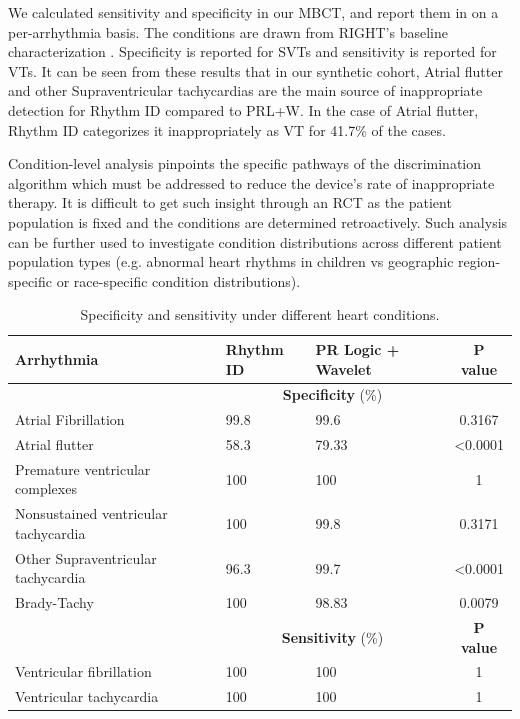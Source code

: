 We calculated sensitivity and specificity in our MBCT, and report them in  on a per-arrhythmia basis.
The conditions are drawn from RIGHT's baseline characterization \cite{GoldABBTB11_RIGHTresults}.
Specificity is reported for SVTs and sensitivity is reported for VTs.
It can be seen from these results that in our synthetic cohort, Atrial flutter and other Supraventricular tachycardias are the main source of inappropriate detection for Rhythm ID compared to PRL+W.
In the case of Atrial flutter, Rhythm ID categorizes it inappropriately as VT for 41.7\% of the cases.

Condition-level analysis pinpoints the specific pathways of the discrimination algorithm which must be addressed to reduce the device's rate of inappropriate therapy. It is difficult to get such insight through an RCT as the patient population is fixed and the conditions are determined retroactively. Such analysis can be further used to investigate condition distributions across different patient population types (e.g. abnormal heart rhythms in children vs geographic region-specific or race-specific condition distributions).   

\begin{table}[t]
\begin{tabular}{|p{2.8cm}|p{1.5cm}|p{1.5cm}|c|}
	\hline Arrhythmia & Rhythm ID & PR Logic + Wavelet  & P value \\ 
	\hline &	\multicolumn{2}{|c|}{\textbf{Specificity} (\%)}& \\
	\hline Atrial Fibrillation & 99.8 & 99.6 & 0.3167 \\ 
	\hline \cellcolor{blue!25} Atrial flutter & 58.3 & 79.33 & <0.0001 \\ 
	\hline Premature ventricular complexes & 100 & 100 & 1 \\ 
	\hline Nonsustained ventricular tachycardia & 100 & 99.8 & 0.3171 \\ 
	\hline \cellcolor{blue!25} Other Supraventricular tachycardia & 96.3 & 99.7 & <0.0001 \\ 
	\hline Brady-Tachy & 100 & 98.83 & 0.0079 \\ 
		\hline
	\hline &	\multicolumn{2}{|c|}{\textbf{Sensitivity} (\%)} & \textbf{P value}\\
	\hline Ventricular fibrillation & 100 & 100 & 1 \\ 
	\hline Ventricular tachycardia & 100 & 100 & 1 \\ 
	\hline 
\end{tabular} 
\caption{Specificity and sensitivity under different heart conditions.
}
\label{tab:vtsvt}
\end{table}

